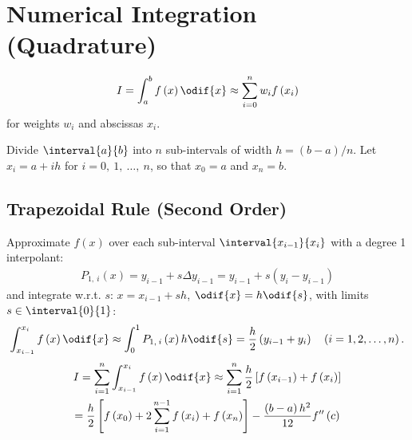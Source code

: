 \documentclass{article}
\begin{document}
\begin{minipage}[t]{126.1962963mm}
    \section{Numerical Integration (Quadrature)}
    \begin{equation*}
        I = \int_a^b f\left( x \right) \odif{x} \approx \sum_{i = 0}^n w_i f\left( x_i \right)
    \end{equation*}
    for weights \(w_i\) and abscissas \(x_i\).

    Divide \(\interval{a}{b}\) into \(n\) sub-intervals of width \(h = \left( b - a \right) / n\).
    Let \(x_i = a + i h\) for \(i = 0,\: 1,\: \ldots,\: n\), so that \(x_0 = a\) and \(x_n = b\).
    \subsection{Trapezoidal Rule (Second Order)}
    Approximate \(f\left( x \right)\) over each sub-interval \(\interval{x_{i - 1}}{x_i}\) with a degree 1 interpolant:
    \begin{align*}
        P_{1,\: i}\left( x \right) = y_{i - 1} + s \Delta{y_{i - 1}} = y_{i - 1} + s \left( y_i - y_{i - 1} \right)
    \end{align*}
    and integrate w.r.t. \(s\): \(x = x_{i - 1} + s h\), \(\odif{x} = h \odif{s}\), with limits \(s \in \interval{0}{1}\):
    \begin{align*}
        \int_{x_{i - 1}}^{x_i} f\left( x \right) \odif{x} \approx \int_0^1 P_{1,\: i}\left( x \right) h \odif{s} = \frac{h}{2} \left( y_{i - 1} + y_i \right) \quad \left(i = 1, 2, \ldots, n\right).
    \end{align*}
    \begin{multline*}
        I = \sum_{i = 1}^n \int_{x_{i-1}}^{x_i} f\left( x \right) \odif{x} \approx \sum_{i = 1}^n \frac{h}{2} \left[ f\left( x_{i - 1} \right) + f\left( x_i \right) \right]                                                                           \\
        = \frac{h}{2} \left[ f\left( x_0 \right) + 2 \sum_{i = 1}^{n - 1} f\left( x_i \right) + f\left( x_n \right) \right] -\frac{\left( b - a \right)h^2}{12} f''\left( c \right)
    \end{multline*}

\end{minipage}
\end{document}

